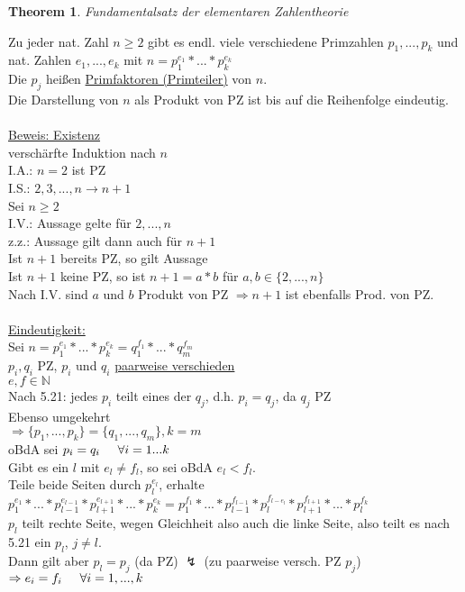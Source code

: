 \documentclass[a4paper,11pt]{article}
\newtheorem{theo}[definition]{Theorem}
\newcommand{\hsp}{\hspace{5mm}}
\begin{document}
\begin{theo}
	Fundamentalsatz der elementaren Zahlentheorie
\end{theo}
Zu jeder nat. Zahl $n\geq2$ gibt es endl. viele verschiedene Primzahlen $p_1,...,p_k$ und nat. Zahlen $e_1,...,e_k$ mit $n=p_1^{e_1}*...*p_k^{e_k}$ \\
Die $p_j$ heißen \underline{Primfaktoren (Primteiler)} von $n$. \\
Die Darstellung von $n$ als Produkt von PZ ist bis auf die Reihenfolge eindeutig. \\
\\
\underline{Beweis: Existenz} \\
verschärfte Induktion nach $n$ \\
I.A.: $n=2$ ist PZ \\
I.S.: $2,3,...,n\rightarrow n+1$ \\
Sei $n\geq2$ \\
I.V.: Aussage gelte für $2,...,n$ \\
z.z.: Aussage gilt dann auch für $n+1$ \\
Ist $n+1$ bereits  PZ, so gilt Aussage \\
Ist $n+1$ keine PZ, so ist $n+1=a*b$ für $a,b\in\{2,...,n\}$ \\
Nach I.V. sind $a$ und $b$ Produkt von PZ $\Rightarrow n+1$ ist ebenfalls Prod. von PZ. \\
\\
\underline{Eindeutigkeit:} \\
Sei $n=p_1^{e_1}*...*p_k^{e_k}=q_1^{f_1}*...*q_m^{f_m}$ \\
$p_i,q_i$ PZ, $p_i$ und $q_i$ \underline{paarweise verschieden} \\
$e,f\in\mathbb{N}$ \\
Nach 5.21: jedes $p_i$ teilt eines der $q_j$, d.h. $p_i=q_j$, da $q_j$ PZ \\
Ebenso umgekehrt \\
$\Rightarrow\{p_1,...,p_k\}=\{q_1,...,q_m\}, k=m$ \\
oBdA sei $p_i=q_i\hsp\forall i=1...k$ \\
Gibt es ein $l$ mit $e_l\neq f_l$, so sei oBdA $e_l<f_l$. \\
Teile beide Seiten durch $p_l^{e_l}$, erhalte $p_1^{e_1}*...*p_{l-1}^{e_{l-1}}*p_{l+1}^{e_{l+1}}*...*p_k^{e_k}=p_1^{f_1}*...*p_{l-1}^{f_{l-1}}*p_l^{f_{l-e_l}}*p_{l+1}^{f_{l+1}}*...*p_l^{f_k}$ \\
$p_l$ teilt rechte Seite, wegen Gleichheit also auch die linke Seite, also teilt es nach 5.21 ein $p_l$, $j\neq l$. \\
Dann gilt aber $p_l=p_j$ (da PZ) $\lightning$ (zu paarweise versch. PZ $p_j$) $\Rightarrow e_i=f_i\hsp\forall i=1,...,k$ \\
\end{document}
